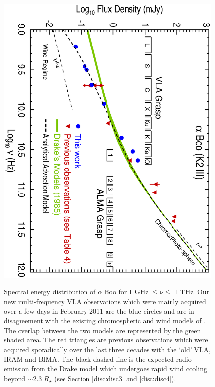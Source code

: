 \documentclass[iop]{emulateapj}
\begin{document}
\begin{figure}
\centering
\includegraphics[trim = 0mm 0mm 0mm 20mm, clip,scale=0.65, angle=90]{fig1.ps}
\\
\caption{Spectral energy distribution of $\alpha$ Boo for 1 GHz $\leq \nu \leq$ 1 THz. Our new multi-frequency VLA observations which were mainly acquired over a few days in February 2011 are the blue circles and are in disagreement with the existing chromospheric and wind models of \cite{1985pssl.proc..351D}. The overlap between the two models are represented by the green shaded area. The red triangles are previous observations which were acquired sporadically over the last three decades with the `old' VLA, IRAM and BIMA. The black dashed line is the expected radio emission from the Drake model which undergoes rapid wind cooling beyond $\sim$2.3 $R_{\star}$ (see Section \ref{disc:disc3} and \ref{disc:disc4}).}
\label{fig:fig1}
\centering

\end{figure}
\end{document}
